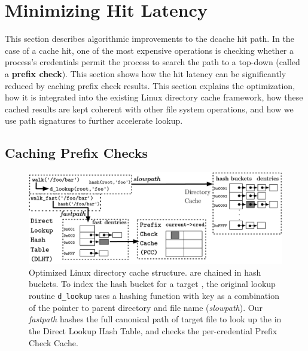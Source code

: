 \section{Minimizing Hit Latency}
\label{sec:dcache}

This section describes
algorithmic improvements to the dcache hit path.  
In the case of a cache hit, one of the most expensive operations
is checking whether 
a process's credentials permit the process to search
the path to a \dentry{} top-down (called a {\bf prefix check}).
This section shows how the hit latency can be significantly reduced
by caching prefix check results.
This section explains the optimization, how it is integrated into the existing Linux directory cache 
framework, how these cached results are kept coherent with other file system operations,
and how we use path signatures to further accelerate lookup.



\subsection{Caching Prefix Checks}
\label{sec:dcache:prefixcheck}

\begin{figure}[t!]
\centering
\includegraphics[width=5.5in]{dcache/figures/dcache-structure.pdf}
\footnotesize
\caption[Optimized Linux directory cache structure.]
{Optimized Linux directory cache structure. \dentries{} are chained in hash buckets. To index the hash bucket for a target \dentry{}, the original lookup routine {\tt d\_lookup} uses a hashing function with key as a combination of the pointer to parent directory and file name ({\em slowpath}).
Our {\em fastpath} hashes the full canonical path of target file to look up the \dentry{}
in the Direct Lookup Hash Table,
and checks the per-credential Prefix Check Cache.}
\label{fig:dcache}
\end{figure}

